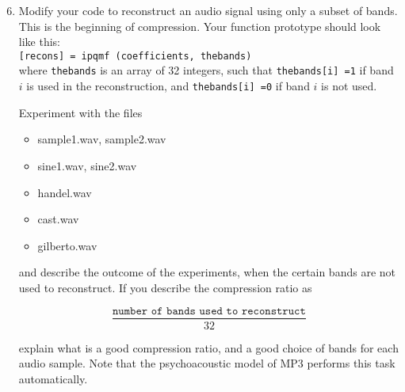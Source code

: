 \documentclass{article} %
\begin{document}
\begin{framed}
\begin{enumerate}
\setcounter{enumi}{5}
\item Modify your code to reconstruct an audio signal using only a subset
of bands. This is the beginning of compression. Your function prototype
should look like this: 
\\[2ex]
\verb|[recons] = ipqmf (coefficients, thebands)|
\\[2ex]

where \verb|thebands| is an array of 32 integers, such that
\verb|thebands[i] =1| if band $i$ is used in the reconstruction, and
\verb|thebands[i] =0| if band $i$ is not used. 

Experiment with the files

\begin{itemize}
\item sample1.wav, sample2.wav
\item sine1.wav, sine2.wav
\item handel.wav
\item cast.wav
\item gilberto.wav
\end{itemize}

and describe the outcome of the experiments, when the certain bands are
not used to reconstruct. If you describe the compression ratio as

\begin{equation}
\frac{\texttt{number of bands used to reconstruct}}{32}
\end{equation}

explain what is a good compression ratio, and a good choice of bands for
each audio sample. Note that the psychoacoustic model of MP3 performs
this task automatically. 
\end{enumerate}
\end{framed}




\end{document}
